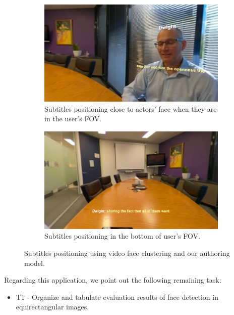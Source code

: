\begin{figure}[!ht]
\centering
    \begin{subfigure}{0.47\linewidth}
        \centering
        \includegraphics[width=1\textwidth]{img/video360/subtitles_actor.png}
        \caption{Subtitles positioning close to actors' face when they are in the user's FOV.}
        \label{subfig:subtitles_actor}
    \end{subfigure}\hfill
    \begin{subfigure}{0.47\linewidth}
        \centering
        \includegraphics[width=1\textwidth]{img/video360/subtitles_bottom.png}
        \caption{Subtitles positioning in the bottom of user's FOV.}
        \label{subfig:subtitles_bottom}
    \end{subfigure}

\caption{Subtitles positioning using video face clustering and our authoring model.}
\label{fig:subtitles}
\end{figure}

Regarding this application, we point out the following remaining task:

\begin{itemize}
    \item T1 - Organize and tabulate evaluation results of face detection in equirectangular images.
\end{itemize}